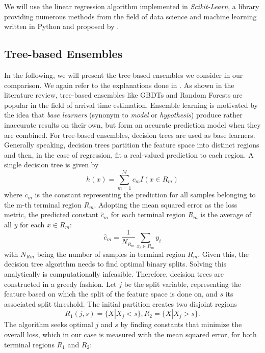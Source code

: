 We will use the linear regression algorithm implemented in \textit{Scikit-Learn}, a library providing numerous methods from the field of data science and machine learning written in Python and proposed by \cite{scikit-learn}.

\subsection{Tree-based Ensembles}

In the following, we will present the tree-based ensembles we consider in our comparison. We again refer to the explanations done in \cite{friedman2001elements}.
As shown in the literature review, tree-based ensembles like GBDTs and Random Forests are popular in the field of arrival time estimation. Ensemble learning is motivated by the idea that \textit{base learners} (synonym to \textit{model} or \textit{hypothesis}) produce rather inaccurate results on their own, but form an accurate prediction model when they are combined. For tree-based ensembles, decision trees are used as base learners. 
Generally speaking, decision trees partition the feature space into distinct regions and then, in the case of regression, fit a real-valued prediction to each region. 
A single decision tree is given by
\begin{equation}
h(x) = \sum_{m=1}^{M} c_m I(x \in R_m)
\end{equation}
where $ c_m $ is the constant representing the prediction for all samples belonging to the m-th terminal region $ R_m $. Adopting the mean squared error as the loss metric, the predicted constant $ \hat{c}_m $ for each terminal region $ R_m $ is the average of all $ y $ for each $ x \in R_m $:
\begin{equation}
	\hat{c}_m =  \dfrac{1}{N_{R_m}}\sum_{x_i \in R_m}^{} y_i
\end{equation}
with $ N_{Rm} $ being the number of samples in terminal region $ R_m $. Given this, the decision tree algorithm needs to find optimal binary splits. Solving this analytically is computationally infeasible. Therefore, decision trees are constructed in a greedy fashion.
Let $ j $ be the split variable, representing the feature based on which the split of the feature space is done on, and $ s $ its associated split threshold.
The initial partition creates two disjoint regions
\begin{equation}
	R_1 (j,s) = \{X | X_j < s \}, R_{2} = \{X | X_j > s\}.
\end{equation}
The algorithm seeks optimal $ j $ and $ s $ by finding constants that minimize the overall loss, which in our case is measured with the mean squared error, for both terminal regions $ R_1 $ and $ R_2 $:
